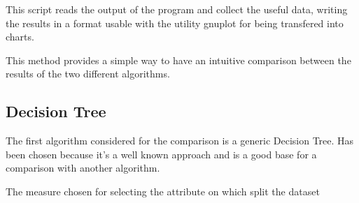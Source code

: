 \documentclass{acm_proc_article-sp-sigmod07}
\begin{document}
This script reads the output of the program and collect the useful data,
writing the results in a format usable with the utility gnuplot for being
transfered into charts.

This method provides a simple way to have an intuitive comparison between the
results of the two different algorithms.

\subsection{Decision Tree}
The first algorithm considered for the comparison is a generic Decision
Tree. Has been chosen because it's a well known approach and is a good
base for a comparison with another algorithm.

The measure chosen for selecting the attribute on which split the dataset



\end{document}
